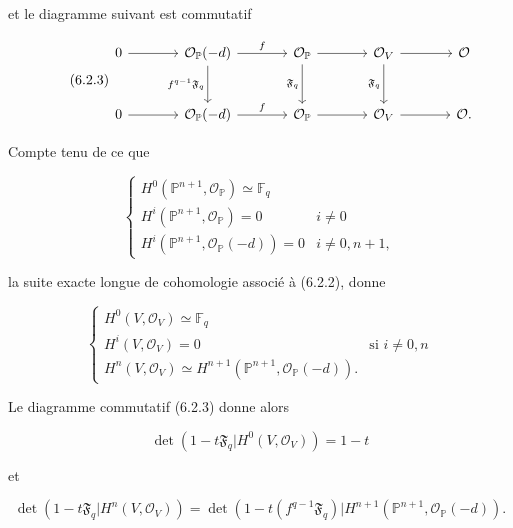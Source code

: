 et le diagramme suivant est commutatif

\begin{equation}\tag{6.2.3}
\begin{tikzcd}[column sep=large,row sep=large]
0 \arrow[r] &
\mathcal O_{\mathbb P}(-d) \arrow[r,"f"] \arrow[d,"f^{q-1}\mathfrak F_q"'] &
\mathcal O_{\mathbb P} \arrow[r] \arrow[d,"\mathfrak F_q"'] &
\mathcal O_V \arrow[r] \arrow[d,"\mathfrak F_q"'] &
\mathcal O\\
0 \arrow[r] &
\mathcal O_{\mathbb P}(-d) \arrow[r,"f"] &
\mathcal O_{\mathbb P} \arrow[r] &
\mathcal O_V \arrow[r] &
\mathcal O .
\end{tikzcd}
\end{equation}


Compte tenu de ce que

\begin{equation}\tag{6.2.4}
\begin{cases}
H^0(\mathbb P^{n+1},\mathcal O_{\mathbb P})\simeq\mathbb F_q\\
H^i(\mathbb P^{n+1},\mathcal O_{\mathbb P})=0&i\ne0\\
H^i(\mathbb P^{n+1},\mathcal O_{\mathbb P}(-d))=0&i\ne0,n+1,
\end{cases}
\end{equation}

la suite exacte longue de cohomologie associé à (6.2.2), donne

\begin{equation}\tag{6.2.5}
\begin{cases}
H^0(V,\mathcal O_V)\simeq\mathbb F_q\\
H^i(V,\mathcal O_V)=0&\text{si }i\ne0,n\\
H^n(V,\mathcal O_V)
\simeq H^{n+1}(\mathbb P^{n+1},\mathcal O_{\mathbb P}(-d)).
\end{cases}
\end{equation}

Le diagramme commutatif (6.2.3) donne alors

\begin{equation}\tag{6.2.6}
\det\!\left(1-t\mathfrak F_q
\mathrel{\Big|}H^0(V,\mathcal O_V)\right)=1-t
\end{equation}

et

\begin{equation}\tag{6.2.7}
\det\!\left(1-t\mathfrak F_q
\mathrel{\Big|}H^n(V,\mathcal O_V)\right)
=
\det\!\left(
1-t(f^{q-1}\mathfrak F_q)
\mathrel{\Big|}
H^{n+1}(\mathbb P^{n+1},\mathcal O_{\mathbb P}(-d))
\right..
\end{equation}

